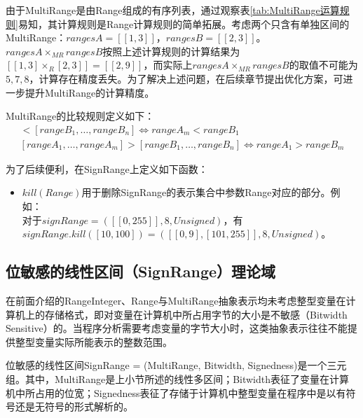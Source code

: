 由于MultiRange是由Range组成的有序列表，通过观察表\ref{tab:MultiRange运算规则}易知，其计算规则是Range计算规则的简单拓展。考虑两个只含有单独区间的MultiRange：$ rangesA = [[1, 3]]$，$ rangesB = [[2, 3]] $。$ rangesA \times_{MR} rangesB $按照上述计算规则的计算结果为$ [[1, 3] \times_R [2, 3]]  = [[2, 9]] $，而实际上$ rangesA \times_{MR} rangesB $的取值不可能为$ 5, 7, 8 $，计算存在精度丢失。为了解决上述问题，在后续章节提出优化方案，可进一步提升MultiRange的计算精度。

MultiRange的比较规则定义如下：
\begin{align}
	[rangeA_1, \dots, rangeA_m] < [rangeB_1, \dots, rangeB_n] \iff rangeA_m < rangeB_1\\
	[rangeA_1, \dots, rangeA_m] > [rangeB_1, \dots, rangeB_n] \iff rangeA_1 > rangeB_m
\end{align}

为了后续便利，在SignRange上定义如下函数：
\begin{itemize}
	\item $ kill(Range)$用于删除SignRange的表示集合中参数Range对应的部分。例如：\\
	对于$ signRange = ([[0, 255]], 8, Unsigned) $，有$ signRange.kill([10, 100]) = ([[0, 9], [101, 255]], 8, Unsigned) $。
\end{itemize}

\subsection{位敏感的线性区间（SignRange）理论域}
\label{sec:SignRange}

在前面介绍的RangeInteger、Range与MultiRange抽象表示均未考虑整型变量在计算机上的存储格式，即对变量在计算机中所占用字节的大小是不敏感（Bitwidth Sensitive）的。当程序分析需要考虑变量的字节大小时，这类抽象表示往往不能提供整型变量实际所能表示的整数范围。

位敏感的线性区间SignRange = (MultiRange, Bitwidth, Signedness)是一个三元组。其中，MultiRange是上小节所述的线性多区间；Bitwidth表征了变量在计算机中所占用的位宽；Signedness表征了存储于计算机中整型变量在程序中是以有符号还是无符号的形式解析的。

